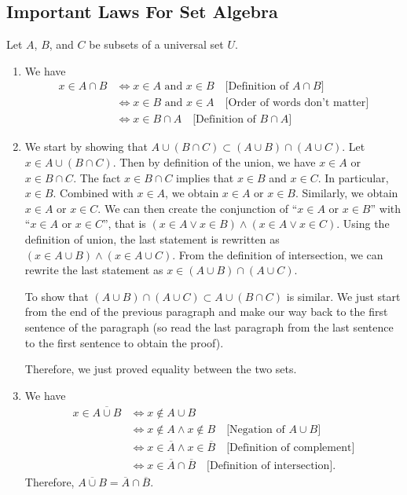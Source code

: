 \subsection{Important Laws For Set Algebra}

\begin{problem}
Let $A$, $B$, and $C$ be subsets of a universal set $U$.
    \begin{enumerate}[label=\alph*)]
        \item We have
            \begin{align*}
            x \in A \cap B & \iff x \in A \text{ and } x \in B \quad \text{[Definition of $A \cap B$]}\\
            & \iff x \in B \text{ and } x \in A \quad \text{[Order of words don't matter]} \\
            & \iff x \in B \cap A \quad \text{[Definition of $B \cap A$]}
            \end{align*}
        \item We start by showing that $A \cup (B \cap C) \subset (A \cup B) \cap (A \cup C)$. Let $x \in A \cup (B \cap C)$. Then by definition of the union, we have $x \in A$ or $x \in B \cap C$. The fact $x \in B \cap C$ implies that $x \in B$ and $x \in C$. In particular, $x \in B$. Combined with $x \in A$, we obtain $x \in A$ or $x \in B$. Similarly, we obtain $x \in A$ or $x \in C$. We can then create the conjunction of ``$x \in A$ or $x \in B$'' with ``$x \in A$ or $x \in C$'', that is $(x \in A \vee x \in B) \wedge (x \in A \vee x \in C)$. Using the definition of union, the last statement is rewritten as $(x \in A \cup B) \wedge (x \in A \cup C)$. From the definition of intersection, we can rewrite the last statement as $x \in (A \cup B) \cap (A \cup C)$. 

        To show that $(A \cup B) \cap (A \cup C) \subset A \cup (B \cap C)$ is similar. We just start from the end of the previous paragraph and make our way back to the first sentence of the paragraph (so read the last paragraph from the last sentence to the first sentence to obtain the proof). 

        Therefore, we just proved equality between the two sets.
        \item We have
            \begin{align*}
             x \in \overline{A \cup B} & \iff x \not\in A \cup B \\
             & \iff x \not\in A \wedge x \not\in B \quad \text{[Negation of $A \cup B$]} \\
             & \iff x \in \overline{A} \wedge x \in \overline{B} \quad \text{[Definition of complement]} \\
             & \iff x \in \overline{A} \cap \overline{B} \quad \text{[Definition of intersection]}.
             \end{align*}
        Therefore, $\overline{A \cup B} = \overline{A} \cap \overline{B}$.
    \end{enumerate}
\end{problem}

